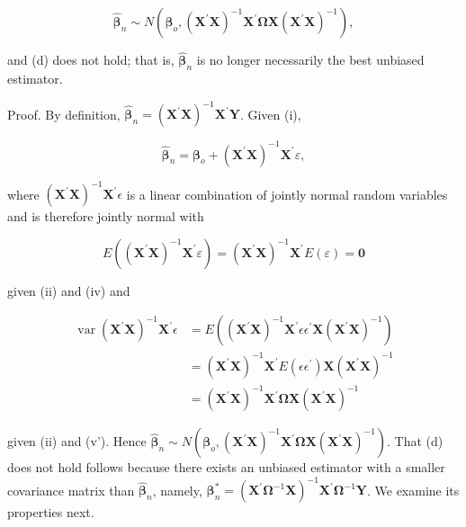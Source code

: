 \documentclass[10pt]{article}
\begin{document}
$$
\hat{\boldsymbol{\beta}}_{n} \sim N\left(\boldsymbol{\beta}_{o},\left(\mathbf{X}^{\prime} \mathbf{X}\right)^{-1} \mathbf{X}^{\prime} \boldsymbol{\Omega} \mathbf{X}\left(\mathbf{X}^{\prime} \mathbf{X}\right)^{-1}\right),
$$

and (d) does not hold; that is, $\hat{\boldsymbol{\beta}}_{n}$ is no longer necessarily the best unbiased estimator.

Proof. By definition, $\hat{\boldsymbol{\beta}}_{n}=\left(\mathbf{X}^{\prime} \mathbf{X}\right)^{-1} \mathbf{X}^{\prime} \mathbf{Y}$. Given (i),

$$
\hat{\boldsymbol{\beta}}_{n}=\boldsymbol{\beta}_{o}+\left(\mathbf{X}^{\prime} \mathbf{X}\right)^{-1} \mathbf{X}^{\prime} \varepsilon,
$$

where $\left(\mathbf{X}^{\prime} \mathbf{X}\right)^{-1} \mathbf{X}^{\prime} \epsilon$ is a linear combination of jointly normal random variables and is therefore jointly normal with

$$
E\left(\left(\mathbf{X}^{\prime} \mathbf{X}\right)^{-1} \mathbf{X}^{\prime} \varepsilon\right)=\left(\mathbf{X}^{\prime} \mathbf{X}\right)^{-1} \mathbf{X}^{\prime} E(\varepsilon)=\mathbf{0}
$$

given (ii) and (iv) and

$$
\begin{aligned}
\operatorname{var}\left(\mathbf{X}^{\prime} \mathbf{X}\right)^{-1} \mathbf{X}^{\prime} \epsilon & =E\left(\left(\mathbf{X}^{\prime} \mathbf{X}\right)^{-1} \mathbf{X}^{\prime} \epsilon \epsilon^{\prime} \mathbf{X}\left(\mathbf{X}^{\prime} \mathbf{X}\right)^{-1}\right) \\
& =\left(\mathbf{X}^{\prime} \mathbf{X}\right)^{-1} \mathbf{X}^{\prime} E\left(\epsilon \epsilon^{\prime}\right) \mathbf{X}\left(\mathbf{X}^{\prime} \mathbf{X}\right)^{-1} \\
& =\left(\mathbf{X}^{\prime} \mathbf{X}\right)^{-1} \mathbf{X}^{\prime} \mathbf{\Omega} \mathbf{X}\left(\mathbf{X}^{\prime} \mathbf{X}\right)^{-1}
\end{aligned}
$$

given (ii) and (v'). Hence $\hat{\boldsymbol{\beta}}_{n} \sim N\left(\boldsymbol{\beta}_{o},\left(\mathbf{X}^{\prime} \mathbf{X}\right)^{-1} \mathbf{X}^{\prime} \boldsymbol{\Omega} \mathbf{X}\left(\mathbf{X}^{\prime} \mathbf{X}\right)^{-1}\right)$. That (d) does not hold follows because there exists an unbiased estimator with a smaller covariance matrix than $\hat{\boldsymbol{\beta}}_{n}$, namely, $\boldsymbol{\beta}_{n}^{*}=\left(\mathbf{X}^{\prime} \boldsymbol{\Omega}^{-1} \mathbf{X}\right)^{-1} \mathbf{X}^{\prime} \boldsymbol{\Omega}^{-1} \mathbf{Y}$. We examine its properties next.
\end{document}
